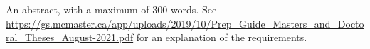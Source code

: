 An abstract, with a maximum of 300 words. See
\url{https://gs.mcmaster.ca/app/uploads/2019/10/Prep_Guide_Masters_and_Doctoral_Theses_August-2021.pdf}
for an explanation of the requirements.

